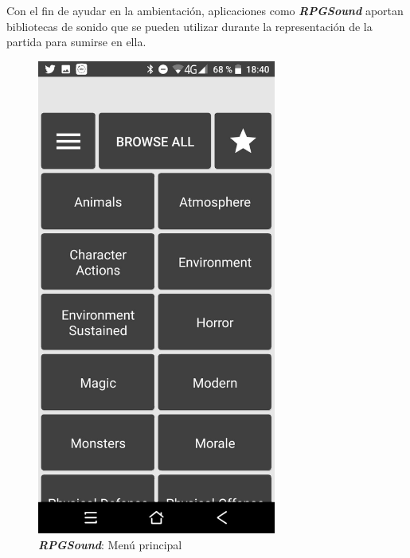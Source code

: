 Con el fin de ayudar en la ambientación, aplicaciones como 
\textit{\textbf{RPGSound}} aportan bibliotecas de sonido que se pueden 
utilizar durante la representación de la partida para sumirse en ella.\vspace{1cm}
\newpage 
\begin{figure}[H]
    \centering
    \begin{minipage}{0.3\textwidth}
        \centering
        \includegraphics[width=0.7\textwidth]{Images/RPGSound_1.jpeg}
        \caption{\textit{\textbf{RPGSound}}: Menú principal}
        

\end{minipage}
\end{figure}
